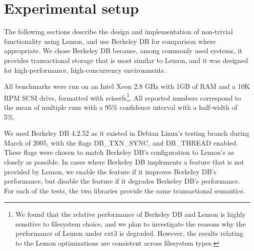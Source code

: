 \documentclass[letterpaper,twocolumn,english]{article}
\newcommand{\yad}{Lemon\xspace}
\newcommand{\oasys}{Juicer\xspace}
\begin{document}
%










\section{Experimental setup}
\label{sec:experimental_setup}

The following sections describe the design and implementation of
non-trivial functionality using \yad, and use Berkeley DB for
comparison where appropriate.  We chose Berkeley DB because, among
commonly used systems, it provides transactional storage that is most
similar to \yad, and it was
designed for high-performance, high-concurrency environments.

All benchmarks were run on an Intel Xeon 2.8 GHz with 1GB of RAM and a
10K RPM SCSI drive, formatted with reiserfs\footnote{We found that the
relative performance of Berkeley DB and \yad is highly sensitive to
filesystem choice, and we plan to investigate the reasons why the
performance of \yad under ext3 is degraded. However, the results
relating to the \yad optimizations are consistent across filesystem
types.}.  All reported numbers correspond to the mean of multiple runs
with a 95\% confidence interval with a half-width of 5\%.

We used Berkeley DB 4.2.52 as it existed in Debian Linux's testing
branch during March of 2005, with the flags DB\_TXN\_SYNC, and DB\_THREAD
enabled. These flags were chosen to match 
Berkeley DB's configuration to \yad's as closely as possible.  In cases where
Berkeley DB implements a feature that is not provided by \yad, we
enable the feature if it improves Berkeley DB's performance, but
disable the feature if it degrades Berkeley DB's performance.
For each of the tests, the two libraries provide the same transactional semantics.
\end{document}
